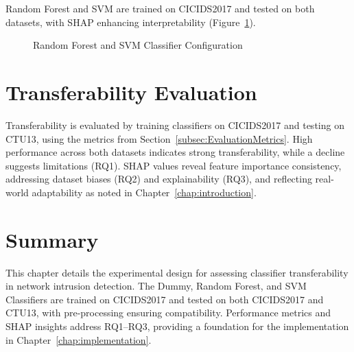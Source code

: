 Random Forest and SVM are trained on CICIDS2017 and tested on both datasets, with SHAP enhancing interpretability (Figure~\ref{fig:RandomForest_SVMClassifierConfig}).

\begin{figure}[H]
    \centering
    \caption{Random Forest and SVM Classifier Configuration}\label{fig:RandomForest_SVMClassifierConfig}
\end{figure}

\section{Transferability Evaluation}\label{sec:TransferabilityEvaluation}

Transferability is evaluated by training classifiers on CICIDS2017 and testing on CTU13, using the metrics from Section~\ref{subsec:EvaluationMetrics}. High performance across both datasets indicates strong transferability, while a decline suggests limitations (RQ1). SHAP values reveal feature importance consistency, addressing dataset biases (RQ2) and explainability (RQ3), and reflecting real-world adaptability as noted in Chapter~\ref{chap:introduction}.

\section{Summary}\label{sec:Summary}

This chapter details the experimental design for assessing classifier transferability in network intrusion detection. The Dummy, Random Forest, and SVM Classifiers are trained on CICIDS2017 and tested on both CICIDS2017 and CTU13, with pre-processing ensuring compatibility. Performance metrics and SHAP insights address RQ1–RQ3, providing a foundation for the implementation in Chapter~\ref{chap:implementation}.